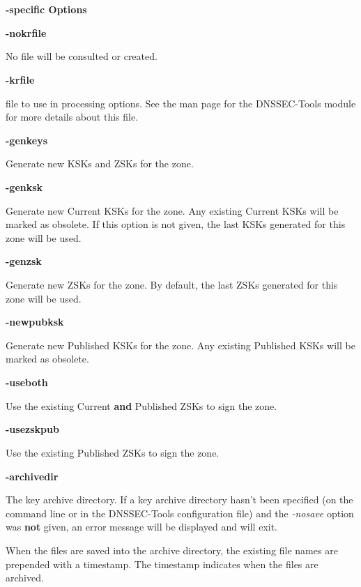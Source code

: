 {\bf {}-specific Options}

\begin{description}

\item {\bf -nokrfile}\verb" "

No  file will be consulted or created.

\item {\bf -krfile}\verb" "

 file to use in processing options.  See the man page for the
DNSSEC-Tools  module for more details about this file.

\item {\bf -genkeys}\verb" "

Generate new KSKs and ZSKs for the zone.

\item {\bf -genksk}\verb" "

Generate new Current KSKs for the zone.  Any existing Current KSKs will be
marked as obsolete.  If this option is not given, the last KSKs generated for
this zone will be used.

\item {\bf -genzsk}\verb" "

Generate new ZSKs for the zone.  By default, the last ZSKs generated for this
zone will be used.

\item {\bf -newpubksk}\verb" "

Generate new Published KSKs for the zone.  Any existing Published KSKs will
be marked as obsolete.

\item {\bf -useboth}\verb" "

Use the existing Current {\bf and} Published ZSKs to sign the zone.

\item {\bf -usezskpub}\verb" "

Use the existing Published ZSKs to sign the zone.

\item {\bf -archivedir}\verb" "

The key archive directory.  If a key archive directory hasn't been specified
(on the command line or in the DNSSEC-Tools configuration file) and the {\it
-nosave} option was {\bf not} given, an error message will be displayed and
 will exit.

When the files are saved into the archive directory, the existing file names
are prepended with a timestamp.  The timestamp indicates when the files are
archived.


\end{description}
